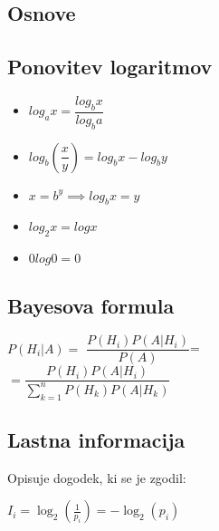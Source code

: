 \documentclass{article}
\begin{document}
\begin{multicols}{4}

\section{Osnove}

\subsection{Ponovitev logaritmov}
\begin{small}
    \begin{itemize} 
        \item $log_a x = \dfrac{log_b x}{log_b a}$
        \item $log_b(\dfrac{x}{y}) = log_b x - log_b y$
        \item $x = b^y \implies log_b x = y$
        \item $log_2 x = log x$
        \item $0log0 = 0$
    \end{itemize}
\end{small}

\subsection{Bayesova formula}
\begin{center}
    \begin{math}
        P(H_{i} | A) = 
    \end{math}
    \begin{math}
        \dfrac{P(H_{i}) P(A | H_{i})}{P(A)}
    \end{math}=\\
    \begin{math}
        = \dfrac{P(H_{i}) P(A | H_{i})}{\sum_{k=1}^{n} P(H_{k}) P(A | H_{k})}
    \end{math}        
\end{center}

\subsection{Lastna informacija}
Opisuje dogodek, ki se je zgodil:
\begin{center}
    \begin{math}
        I_i = \log_2(\frac{1}{p_i}) = - \log_2(p_i)
    \end{math}
\end{center}


\end{multicols}
\end{document}
